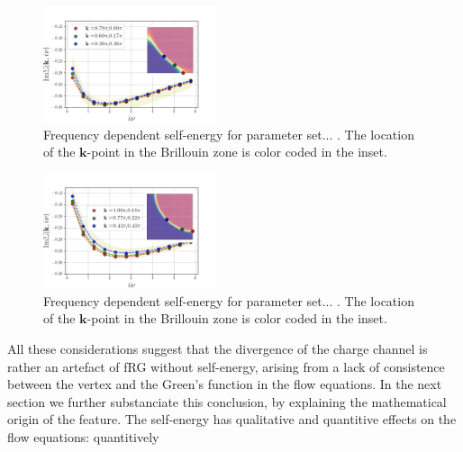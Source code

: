 \begin{figure}
\includegraphics[width=0.45\textwidth]{images/Self_Im_occ0600.png}
\caption{Frequency dependent self-energy for parameter set... .
The location of the $\mathbf{k}$-point in the Brillouin zone is color coded in the inset. }
\label{fig:selffermi0600}
\end{figure}


\begin{figure}
\includegraphics[width=0.45\textwidth]{images/Self_Im_occ0975.png}
\caption{Frequency dependent self-energy for parameter set... .
The location of the $\mathbf{k}$-point in the Brillouin zone is color coded in the inset. }
\label{fig:selffermi0975}
\end{figure}


All these considerations suggest that the divergence of the charge channel is rather an artefact of fRG without self-energy, arising from a lack of consistence between the vertex and the Green's function in the flow equations. 
In the next section we further substanciate this conclusion, by explaining the mathematical origin of the feature. 
The self-energy has qualitative and quantitive effects on the flow equations: quantitively 


